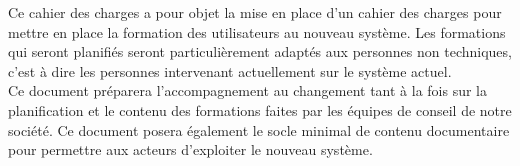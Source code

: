 Ce cahier des charges a pour objet la mise en place d'un cahier des charges pour mettre en place la formation des utilisateurs au nouveau système. Les formations qui seront planifiés seront particulièrement adaptés aux personnes non techniques, c'est à dire les personnes intervenant actuellement sur le système actuel. \\

Ce document préparera l'accompagnement au changement tant à la fois sur la planification et le contenu des formations faites par les équipes de conseil de notre société. Ce document posera
également le socle minimal de contenu documentaire pour permettre aux acteurs d'exploiter le nouveau système.


\vfill
\pagebreak


